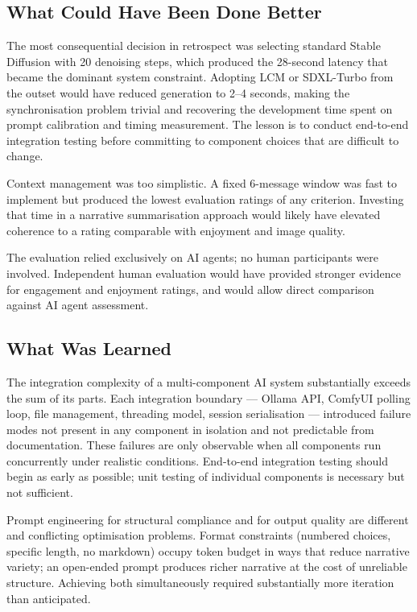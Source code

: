 \documentclass[12pt,a4paper]{article}
\begin{document}
\subsection{What Could Have Been Done Better}

The most consequential decision in retrospect was selecting standard Stable Diffusion with 20 denoising steps, which produced the 28-second latency that became the dominant system constraint. Adopting LCM or SDXL-Turbo from the outset would have reduced generation to 2--4 seconds, making the synchronisation problem trivial and recovering the development time spent on prompt calibration and timing measurement. The lesson is to conduct end-to-end integration testing before committing to component choices that are difficult to change.

Context management was too simplistic. A fixed 6-message window was fast to implement but produced the lowest evaluation ratings of any criterion. Investing that time in a narrative summarisation approach would likely have elevated coherence to a rating comparable with enjoyment and image quality.

The evaluation relied exclusively on AI agents; no human participants were involved. Independent human evaluation would have provided stronger evidence for engagement and enjoyment ratings, and would allow direct comparison against AI agent assessment.

\subsection{What Was Learned}

The integration complexity of a multi-component AI system substantially exceeds the sum of its parts. Each integration boundary --- Ollama API, ComfyUI polling loop, file management, threading model, session serialisation --- introduced failure modes not present in any component in isolation and not predictable from documentation. These failures are only observable when all components run concurrently under realistic conditions. End-to-end integration testing should begin as early as possible; unit testing of individual components is necessary but not sufficient.

Prompt engineering for structural compliance and for output quality are different and conflicting optimisation problems. Format constraints (numbered choices, specific length, no markdown) occupy token budget in ways that reduce narrative variety; an open-ended prompt produces richer narrative at the cost of unreliable structure. Achieving both simultaneously required substantially more iteration than anticipated.
\end{document}
